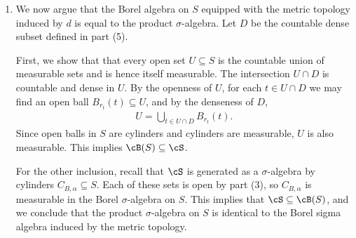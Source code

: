 \begin{homework}[e]
\begin{prf}
\begin{enumerate}[(1)]
			\item We now argue that the Borel algebra on $S$ equipped with the metric topology induced by $d$ is equal to the product $\sigma$-algebra. Let $D$ be the countable dense subset defined in part (5).

				First, we show that that every open set $U \subseteq S$ is the countable union of measurable sets and is hence itself measurable. The intersection $U \cap D$ is countable and dense in $U$. By the openness of $U$, for each $t \in U\cap D$ we may find an open ball $B_{r_t}(t) \subseteq U$, and by the denseness of $D$,
				\begin{align*}
					U = \bigcup_{t \in U\cap D} B_{r_t}(t).
				\end{align*}
				Since open balls in $S$ are cylinders and cylinders are measurable, $U$ is also measurable. This implies $\cB(S) \subseteq \cS$.

				For the other inclusion, recall that $\cS$ is generated as a $\sigma$-algebra by cylinders $C_{B,\alpha} \subseteq S$. Each of these sets is open by part (3), so $C_{B,\alpha}$ is measurable in the Borel $\sigma$-algebra on $S$. This implies that $\cS \subseteq \cB(S)$, and we conclude that the product $\sigma$-algebra on $S$ is identical to the Borel sigma algebra induced by the metric topology.
		\end{enumerate}
	\end{prf}
\end{homework}

